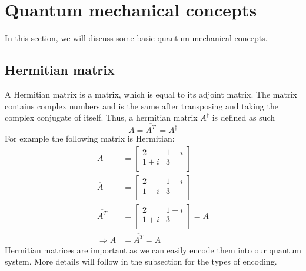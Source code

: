 \section{Quantum mechanical concepts}
In this section, we will discuss some basic quantum mechanical concepts. 

\subsection{Hermitian matrix}
A Hermitian matrix is a matrix, which is equal to its adjoint matrix. 
The matrix contains complex numbers and is the same after transposing and taking the complex conjugate of itself. 
Thus, a hermitian matrix $A^\dagger$ is defined as such
\begin{equation}
 A = \overline{A^T} \ = A^\dagger
\end{equation}
For example the following matrix is Hermitian:
\begin{equation}
\begin{split}
A &= \begin{bmatrix} 2 & 1-i \\ 1+i & 3 \\ \end{bmatrix} \\
\overline A &= \begin{bmatrix} 2 & 1+i \\ 1-i & 3 \\ \end{bmatrix}\\
\overline{A^T} &= \begin{bmatrix} 2 & 1-i \\ 1+i & 3 \\ \end{bmatrix} = A\\
\Rightarrow A &= \overline{A^T} = A^\dagger
\end{split}
\end{equation}
Hermitian matrices are important as we can easily encode them into our quantum system. 
More details will follow in the subsection for the types of encoding.

